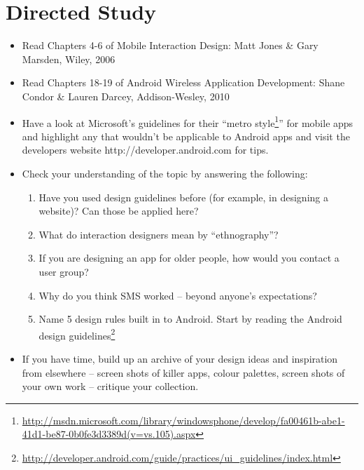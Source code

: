 \documentclass[12pt, a4paper, twoside]{book}
\begin{document}
\section{Directed Study}
\begin{itemize}
\item Read Chapters 4-6  of Mobile Interaction Design: Matt Jones \& Gary Marsden, Wiley, 2006
\item Read Chapters 18-19 of Android Wireless Application Development: Shane Condor \& Lauren Darcey, Addison-Wesley, 2010
\item Have a look at Microsoft’s guidelines  for their “metro style\footnote{\url{http://msdn.microsoft.com/library/windowsphone/develop/fa00461b-abe1-41d1-be87-0b0fe3d3389d(v=vs.105).aspx}}” for mobile apps and highlight any that wouldn’t be applicable to Android apps and visit the developers website http://developer.android.com for tips.
\item Check your understanding of the topic by answering the following:
\begin{enumerate}
\item Have you used design guidelines before (for example, in designing a website)? Can those be applied here?
\item What do interaction designers mean by “ethnography”?
\item If you are designing an app for older people, how would you contact a user group?
\item Why do you think SMS worked – beyond anyone's expectations?
\item Name 5 design rules built in to Android. Start by reading the Android design guidelines\footnote{\url{http://developer.android.com/guide/practices/ui_guidelines/index.html}}
\end{enumerate}
\item If you have time, build up an archive of your design ideas and inspiration from elsewhere – screen shots of killer apps, colour palettes, screen shots of your own work – critique your collection.
\end{itemize}

\end{document}
